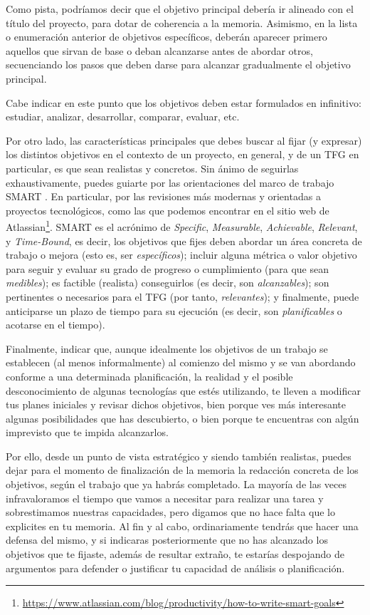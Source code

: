 Como pista, podríamos decir que el objetivo principal debería ir alineado con el título del proyecto, para dotar de coherencia a la memoria. Asimismo, en la lista o enumeración anterior de objetivos específicos, deberán aparecer primero aquellos que sirvan de base o deban alcanzarse antes de abordar otros, secuenciando los pasos que deben darse para alcanzar gradualmente el objetivo principal.

Cabe indicar en este punto que los objetivos deben estar formulados en infinitivo: estudiar, analizar, desarrollar, comparar, evaluar, etc.  

Por otro lado, las características principales que debes buscar al fijar (y expresar) los distintos objetivos en el contexto de un proyecto, en general, y de un TFG en particular, es que sean realistas y concretos. Sin ánimo de seguirlas exhaustivamente, puedes guiarte por las orientaciones del marco de trabajo SMART \cite{doran1981there}. En particular, por las revisiones más modernas y orientadas a proyectos tecnológicos, como las que podemos encontrar en el sitio web de {Atlassian}\footnote{\url{https://www.atlassian.com/blog/productivity/how-to-write-smart-goals}}. SMART es el acrónimo de \textit{Specific}, \textit{Measurable}, \textit{Achievable}, \textit{Relevant}, y \textit{Time-Bound}, es decir, los objetivos que fijes deben abordar un área concreta de trabajo o mejora (esto es, ser \textit{específicos}); incluir alguna métrica o valor objetivo para seguir y evaluar su grado de progreso o cumplimiento (para que sean \textit{medibles}); es factible (realista) conseguirlos (es decir, son \textit{alcanzables}); son pertinentes o necesarios para el TFG (por tanto, \textit{relevantes}); y finalmente, puede anticiparse un plazo de tiempo para su ejecución (es decir, son \textit{planificables} o acotarse en el tiempo).

Finalmente, indicar que, aunque idealmente los objetivos de un trabajo se establecen (al menos informalmente) al comienzo del mismo y se van abordando conforme a una determinada planificación, la realidad y el posible desconocimiento de algunas tecnologías que estés utilizando, te lleven a modificar tus planes iniciales y revisar dichos objetivos, bien porque ves más interesante algunas posibilidades que has descubierto, o bien porque te encuentras con algún imprevisto que te impida alcanzarlos.

Por ello, desde un punto de vista estratégico y siendo también realistas, puedes dejar para el momento de finalización de la memoria la redacción concreta de los objetivos, según el trabajo que ya habrás completado. La mayoría de las veces infravaloramos el tiempo que vamos a necesitar para realizar una tarea y sobrestimamos nuestras capacidades, pero digamos que no hace falta que lo explicites en tu memoria. Al fin y al cabo, ordinariamente tendrás que hacer una defensa del mismo, y si indicaras posteriormente que no has alcanzado los objetivos que te fijaste, además de resultar extraño, te estarías despojando de argumentos para defender o justificar tu capacidad de análisis o planificación.  

